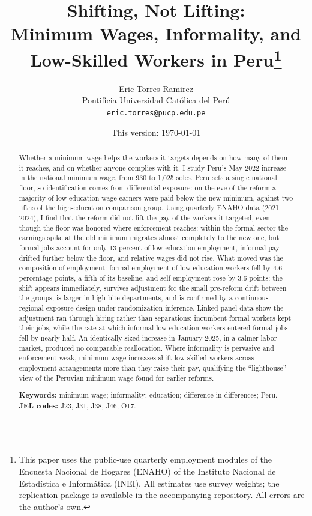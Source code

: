 \documentclass[12pt]{article}
\title{\textbf{Shifting, Not Lifting:\\
Minimum Wages, Informality, and Low-Skilled Workers in Peru}\thanks{This paper uses the public-use quarterly
employment modules of the Encuesta Nacional de Hogares (ENAHO) of the Instituto
Nacional de Estadística e Informática (INEI). All estimates use survey weights;
the replication package is available in the accompanying repository. All errors are
the author's own.}}
\author{Eric Torres Ramirez\\
  \small Pontificia Universidad Católica del Perú\\
  \small \texttt{eric.torres@pucp.edu.pe}}
\date{This version: \today}
\begin{document}
\maketitle

\begin{abstract}
\noindent
Whether a minimum wage helps the workers it targets depends on how many of them it
reaches, and on whether anyone complies with it. I study Peru's May 2022 increase in
the national minimum wage, from 930 to 1,025 soles. Peru sets a single national floor,
so identification comes from differential exposure: on the eve of the reform a majority
of low-education wage earners were paid below the new minimum, against two fifths of
the high-education comparison group. Using quarterly ENAHO data (2021--2024), I find
that the reform did not lift the pay of the workers it targeted, even though the floor
was honored where enforcement reaches: within the formal sector the earnings spike at
the old minimum migrates almost completely to the new one, but formal jobs account for
only 13 percent of low-education employment, informal pay drifted further below the
floor, and relative wages did not rise. What moved was the composition of employment:
formal employment of low-education workers fell by 4.6 percentage points, a fifth of
its baseline, and self-employment rose by 3.6 points; the shift appears immediately,
survives adjustment for the small pre-reform drift between the groups, is larger in
high-bite departments, and is confirmed by a continuous regional-exposure design
under randomization inference. Linked panel data show the adjustment ran through
hiring rather than separations: incumbent formal workers kept their jobs, while the
rate at which informal low-education workers entered formal jobs fell by nearly
half. An identically sized increase
in January 2025, in a calmer labor market, produced no comparable reallocation. Where
informality is pervasive and enforcement weak, minimum wage increases shift low-skilled
workers across employment arrangements more than they raise their pay, qualifying the
``lighthouse'' view of the Peruvian minimum wage found for earlier reforms.

\medskip
\noindent\textbf{Keywords:} minimum wage; informality; education; difference-in-differences; Peru.\\
\noindent\textbf{JEL codes:} J23, J31, J38, J46, O17.
\end{abstract}

\newpage
{}











\end{document}

